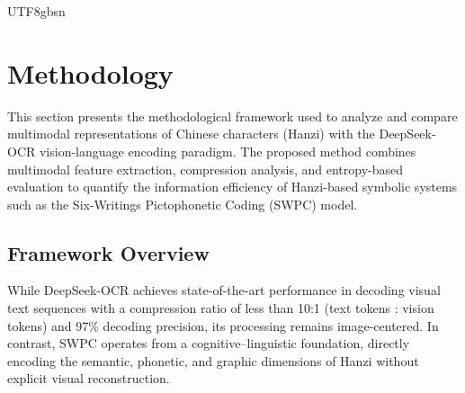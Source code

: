 \documentclass[conference]{IEEEtran}
\begin{document}
\begin{CJK*}{UTF8}{gbsn}


\section{Methodology}
\label{sec:methodology}

This section presents the methodological framework used to analyze and compare multimodal representations of Chinese characters (Hanzi) with the DeepSeek-OCR vision-language encoding paradigm. The proposed method combines multimodal feature extraction, compression analysis, and entropy-based evaluation to quantify the information efficiency of Hanzi-based symbolic systems such as the Six-Writings Pictophonetic Coding (SWPC) model.

\subsection{Framework Overview}

While DeepSeek-OCR \citep{wei2025deepseek} achieves state-of-the-art performance in decoding visual text sequences with a compression ratio of less than 10:1 (text tokens : vision tokens) and 97\% decoding precision, its processing remains image-centered. In contrast, SWPC operates from a cognitive–linguistic foundation, directly encoding the semantic, phonetic, and graphic dimensions of Hanzi without explicit visual reconstruction.


\end{CJK*}
\end{document}
